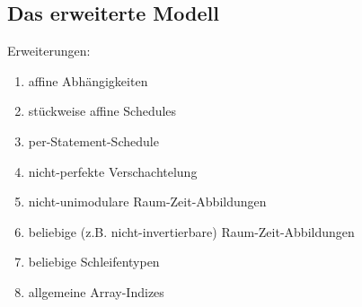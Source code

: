 \subsection{Das erweiterte Modell}
\label{sec:new-mod}

Erweiterungen:
\begin{enumerate}
\item affine Abhängigkeiten\\[-7mm]
\item stückweise affine Schedules\\[-7mm]
\item per-Statement-Schedule\\[-7mm]
\item nicht-perfekte Verschachtelung\\[-7mm]
\item nicht-unimodulare Raum-Zeit-Abbildungen\\[-7mm]
\item beliebige (z.B. nicht-invertierbare) Raum-Zeit-Abbildungen\\[-7mm]
\item beliebige Schleifentypen\\[-7mm]
\item allgemeine Array-Indizes\\[-7mm]
\end{enumerate}
